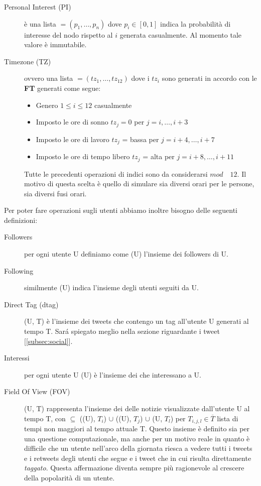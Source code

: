 \begin{description}
  \item[Personal Interest (PI)] \`e una lista \PI{} 
    $=(p_1, \dots, p_n)$ dove $p_i \in [0, 1]$ 
    indica la probabilit\`a di interesse del nodo rispetto al 
    \topic{} $i$ generata casualmente. Al momento tale valore \`e immutabile.
  \item[Timezone (TZ)] ovvero una lista \TZ{} $=(tz_1, \dots, tz_{12}) $
  dove i $tz_i$ sono generati in accordo con le \textbf{FT} generati 
  come segue:
  \begin{itemize}
    \item Genero $1\leq i \leq 12$ casualmente
    \item Imposto le ore di sonno $tz_j = 0$ per $j = i, \dots , i+3$
    \item Imposto le ore di lavoro $tz_j$ = bassa \activity{} per 
      $j = i+4, \dots , i+7$ 
    \item Imposto le ore di tempo libero $tz_j$ = alta \activity{}
      per $j = i+8, \dots , i+11$ 
  \end{itemize}
  Tutte le precedenti operazioni di indici sono da considerarsi 
  $mod \quad 12$. Il motivo di questa scelta \`e quello di simulare
  sia diversi orari per le persone, sia diversi fusi orari.
\end{description}

Per poter fare operazioni sugli utenti abbiamo inoltre bisogno delle 
seguenti definizioni:

\begin{description}
  \item[Followers] per ogni utente U definiamo come \followers{}(U) 
  l'insieme dei followers di U.
  \item[Following] similmente \following{}(U) indica
  l'insieme degli utenti seguiti da U.
  \item[Direct Tag (dtag)] \dtag{}(U, T) \`e l'insieme dei tweets che
  contengo un tag all'utente U generati al tempo T. 
  Sar\'a spiegato meglio nella sezione
  riguardante i tweet [\ref{subsec:social}].
  \item[Interessi] per ogni utente U \interest{}(U) \`e l'insieme
  dei \topic{} che interessano a U.
  \item[Field Of View (FOV)] \FOV{}(U, T) rappresenta l'insieme dei
  delle notizie visualizzate dall'utente U al tempo T, con 
  \FOV{} $\subseteq$ \twt{}(\following{}(U), $T_i$) $\cup$ 
  \retwt{}(\following{}(U), $T_j$) $\cup$ \dtag{}(U, $T_l$) 
  per $T_{i,j,l} \in \overline{T}$ lista di
  tempi non maggiori al tempo attuale T.
  Questo insieme \`e definito sia per una questione
  computazionale, ma anche per un motivo reale in quanto \`e 
  difficile che un utente nell'arco della giornata riesca a vedere
  tutti i tweets e i retweets degli utenti che segue e i tweet che
  in cui risulta direttamente \textit{taggato}. Questa affermazione
  diventa sempre pi\`u ragionevole al crescere della popolarit\`a 
  di un utente.
  
\end{description}

